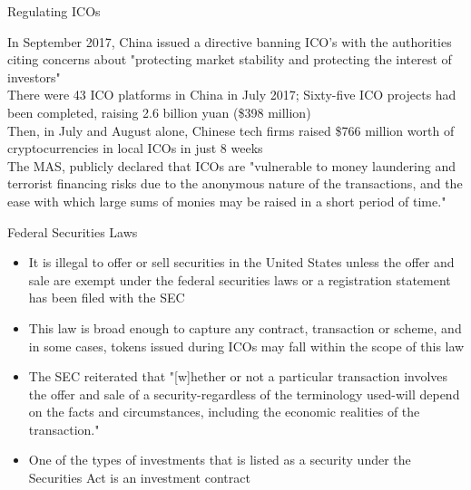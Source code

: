 \documentclass[11pt]{beamer}
\begin{document}
\begin{frame}{Regulating ICOs}
	\begin{small}
		In September 2017, China issued a directive banning ICO's with the authorities citing concerns about "protecting market stability and protecting the interest of investors"\\ \vspace{3mm}
		There were 43 ICO platforms in China in July 2017; Sixty-five ICO projects had been completed, raising 2.6 billion yuan (\$398 million) \\ \vspace{3mm}
		Then, in July and August alone, Chinese tech firms raised \$766 million worth of cryptocurrencies in local ICOs in just 8 weeks \\ \vspace{3mm}
		The MAS, publicly declared that ICOs are "vulnerable to money laundering and terrorist financing risks due to the anonymous nature of the transactions, and the ease with which large sums of monies may be raised in a short period of time."\\ \vspace{3mm}
	\end{small}
\end{frame}


\begin{frame}{Federal Securities Laws}
	\begin{itemize}
		\item It is illegal to offer or sell securities in the United States unless the offer and sale are exempt under the federal securities laws or a registration statement has been filed with the SEC
		\item This law is broad enough to capture any contract, transaction or scheme, and in some cases, tokens issued during ICOs may fall within the scope of this law
		\item The SEC reiterated that "[w]hether or not a particular transaction involves the offer and sale of a security-regardless of the terminology used-will depend on the facts and circumstances, including the economic realities of the transaction."
		\item One of the types of investments that is listed as a security under the Securities Act is an investment contract
	\end{itemize}
\end{frame}
\end{document}
